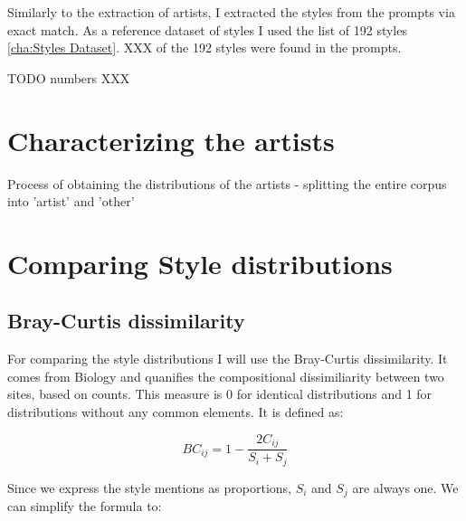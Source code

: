 Similarly to the extraction of artists, I extracted the styles from the prompts via exact match. As a reference dataset of styles I used the list of 192 styles \ref{cha:Styles Dataset}. XXX of the 192 styles were found in the prompts.

TODO numbers XXX


\section{Characterizing the artists}

Process of obtaining the distributions of the artists 
- splitting the entire corpus into 'artist' and 'other'

\section{Comparing Style distributions}

\subsection{Bray-Curtis dissimilarity}








For comparing the style distributions I will use the Bray-Curtis dissimilarity. It comes from Biology and quanifies the compositional dissimiliarity between two sites, based on counts. This measure is 0 for identical distributions and 1 for distributions without any common elements. It is defined as:

\[ BC_{ij} = 1 - \frac{2C_{ij}}{S_i + S_j}\]

Since we express the style mentions as proportions, \(S_i\) and \(S_j\) are always one. We can simplify the formula to:

